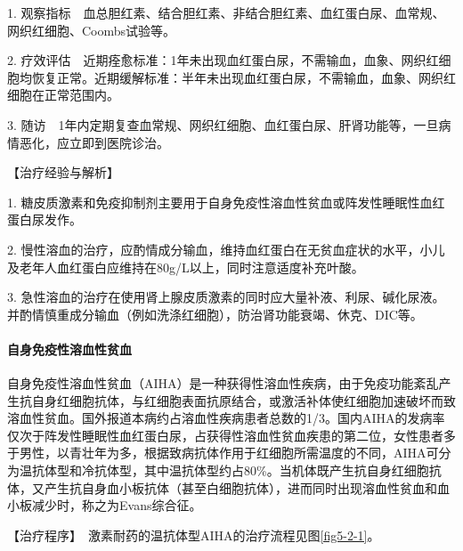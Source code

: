 1.
观察指标　血总胆红素、结合胆红素、非结合胆红素、血红蛋白尿、血常规、网织红细胞、Coombs试验等。

2.
疗效评估　近期痊愈标准：1年未出现血红蛋白尿，不需输血，血象、网织红细胞均恢复正常。近期缓解标准：半年未出现血红蛋白尿，不需输血，血象、网织红细胞在正常范围内。

3.
随访　1年内定期复查血常规、网织红细胞、血红蛋白尿、肝肾功能等，一旦病情恶化，应立即到医院诊治。

【治疗经验与解析】

1.
糖皮质激素和免疫抑制剂主要用于自身免疫性溶血性贫血或阵发性睡眠性血红蛋白尿发作。

2.
慢性溶血的治疗，应酌情成分输血，维持血红蛋白在无贫血症状的水平，小儿及老年人血红蛋白应维持在80g/L以上，同时注意适度补充叶酸。

3.
急性溶血的治疗在使用肾上腺皮质激素的同时应大量补液、利尿、碱化尿液。并酌情慎重成分输血（例如洗涤红细胞），防治肾功能衰竭、休克、DIC等。

\paragraph{自身免疫性溶血性贫血}

自身免疫性溶血性贫血（AIHA）是一种获得性溶血性疾病，由于免疫功能紊乱产生抗自身红细胞抗体，与红细胞表面抗原结合，或激活补体使红细胞加速破坏而致溶血性贫血。国外报道本病约占溶血性疾病患者总数的1/3。国内AIHA的发病率仅次于阵发性睡眠性血红蛋白尿，占获得性溶血性贫血疾患的第二位，女性患者多于男性，以青壮年为多，根据致病抗体作用于红细胞所需温度的不同，AIHA可分为温抗体型和冷抗体型，其中温抗体型约占80\%。当机体既产生抗自身红细胞抗体，又产生抗自身血小板抗体（甚至白细胞抗体），进而同时出现溶血性贫血和血小板减少时，称之为Evans综合征。

【治疗程序】　激素耐药的温抗体型AIHA的治疗流程见图\ref{fig5-2-1}。

